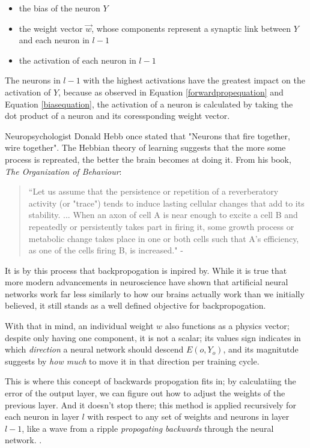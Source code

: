 \documentclass[12pt]{article}
\begin{document}
        \begin{itemize}
            \item the bias of the neuron $Y$
            \item the weight vector $\vec{w}$, whose components represent a synaptic link  between $Y$ and each neuron in $l - 1$
            \item the activation of each neuron in $l - 1$
        \end{itemize}

        The neurons in $l - 1$ with the highest activations have the greatest impact on the activation of $Y$, because as observed in Equation \ref{forwardpropequation} and Equation \ref{biasequation}, the activation of a neuron is calculated by taking the dot product of a neuron and its coressponding weight vector.

        Neuropsychologist Donald Hebb once stated that "Neurons that fire together, wire together". The Hebbian theory of learning suggests that the more some process is repreated, the better the brain becomes at doing it. From his book, \textit{The Organization of Behaviour}:

        \begin{quote}
            ``Let us assume that the persistence or repetition of a reverberatory activity (or "trace") tends to induce lasting cellular changes that add to its stability. ... When an axon of cell A is near enough to excite a cell B and repeatedly or persistently takes part in firing it, some growth process or metabolic change takes place in one or both cells such that A's efficiency, as one of the cells firing B, is increased." - \textcite{Hebb1949}
        \end{quote}

        It is by this process that backpropogation is inpired by. While it is true that more modern advancements in neuroscience have shown that artificial neural networks work far less similarly to how our brains actually work than we initially believed, it still stands as a well defined objective for backpropogation.

        With that in mind, an individual weight $w$ also functions as a physics vector; despite only having one component, it is not a scalar; its values sign indicates in which \textit{direction} a neural network should descend $E(o, Y_o)$, and its magnitutde suggests by \textit{how much} to move it in that direction per training cycle.

        This is where this concept of backwards propogation fits in; by calculatiing the error of the output layer, we can figure out how to adjust the weights of the previous layer. And it doesn't stop there; this method is applied recursively for each neuron in layer $l$ with respect to any set of weights and neurons in layer $l - 1$, like a wave from a ripple \textit{propogating backwards} through the neural network. \textcite{Nielsen2015}.
\end{document}

